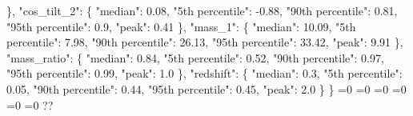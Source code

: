 {{      \}, %
      "cos\_tilt\_2": \{%
        "median": 0.08, %
        "5th percentile": {-}0.88, %
        "90th percentile": 0.81, %
        "95th percentile": 0.9, %
        "peak": 0.41%
      \}, %
      "mass\_1": \{%
        "median": 10.09, %
        "5th percentile": 7.98, %
        "90th percentile": 26.13, %
        "95th percentile": 33.42, %
        "peak": 9.91%
      \}, %
      "mass\_ratio": \{%
        "median": 0.84, %
        "5th percentile": 0.52, %
        "90th percentile": 0.97, %
        "95th percentile": 0.99, %
        "peak": 1.0%
      \}, %
      "redshift": \{%
        "median": 0.3, %
        "5th percentile": 0.05, %
        "90th percentile": 0.44, %
        "95th percentile": 0.45, %
        "peak": 2.0%
      \}%
    \}}%
  \else%
    \ifnum{}=0%
      \let\MagTruncnormIidTiltIsotropicTruncnormNnd@II@out\MagTruncnormIidTiltIsotropicTruncnormNnd@XXX%
    \else%
      \ifnum{}=0%
      \let\MagTruncnormIidTiltIsotropicTruncnormNnd@II@out\MagTruncnormIidTiltIsotropicTruncnormNnd@XXXI%
    \else%
      \ifnum{}=0%
      \let\MagTruncnormIidTiltIsotropicTruncnormNnd@II@out\MagTruncnormIidTiltIsotropicTruncnormNnd@XXXII%
    \else%
      \ifnum{}=0%
      \let\MagTruncnormIidTiltIsotropicTruncnormNnd@II@out\MagTruncnormIidTiltIsotropicTruncnormNnd@XXXIII%
    \else%
      \ifnum{}=0%
      \let\MagTruncnormIidTiltIsotropicTruncnormNnd@II@out\MagTruncnormIidTiltIsotropicTruncnormNnd@XXXIV%
    \else%
      \ifnum{}=0%
      \let\MagTruncnormIidTiltIsotropicTruncnormNnd@II@out\MagTruncnormIidTiltIsotropicTruncnormNnd@XXXV%
    \else%
      \def\MagTruncnormIidTiltIsotropicTruncnormNnd@II@out{%
    ??}%
    \fi\fi\fi\fi\fi\fi
  \fi
  \MagTruncnormIidTiltIsotropicTruncnormNnd@II@out
}\newcommand\MagTruncnormIidTiltIsotropicTruncnormNnd@III[1][all]{%
  \ifnum\pdfstrcmp{#1}{all}=0%
    \def\MagTruncnormIidTiltIsotropicTruncnormNnd@III@out{%
    \{%
      "median": 1.85, %
      "5th percentile": 0.11, %
      "95th percentile": 3.13, %
      "error plus": 1.28, %
      "error minus": 1.74%
    \}}%
  \else%
    \ifnum\pdfstrcmp{#1}{median}=0%
      \def\MagTruncnormIidTiltIsotropicTruncnormNnd@III@out{%
    1.85}%
    \else%
      \ifnum\pdfstrcmp{#1}{5th percentile}=0%
      \def\MagTruncnormIidTiltIsotropicTruncnormNnd@III@out{%
    0.11}%
    \else%
      \ifnum\pdfstrcmp{#1}{95th percentile}=0%
      \def\MagTruncnormIidTiltIsotropicTruncnormNnd@III@out{%
    3.13}%
    \else%
      \ifnum\pdfstrcmp{#1}{error plus}=0%
}
